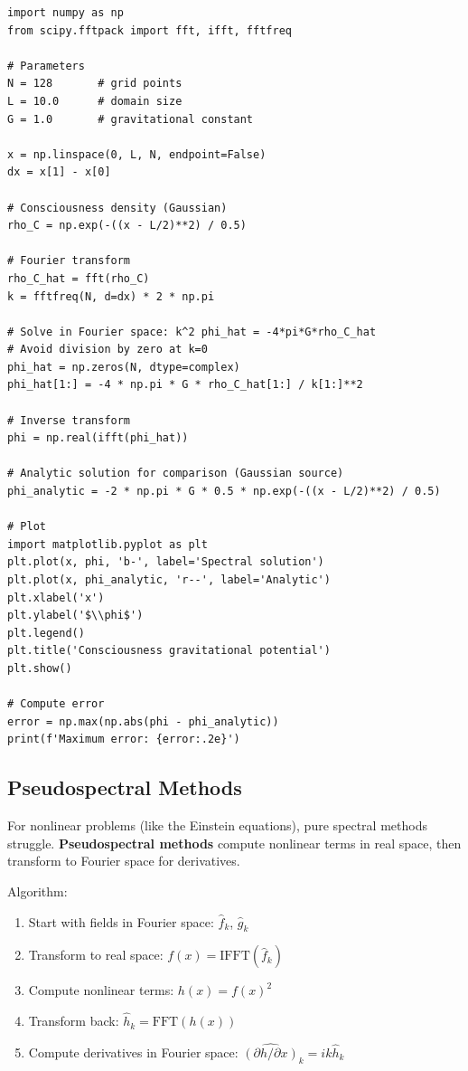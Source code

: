 \begin{lstlisting}[style=python, caption={Spectral method for Poisson equation}]
import numpy as np
from scipy.fftpack import fft, ifft, fftfreq

# Parameters
N = 128       # grid points
L = 10.0      # domain size
G = 1.0       # gravitational constant

x = np.linspace(0, L, N, endpoint=False)
dx = x[1] - x[0]

# Consciousness density (Gaussian)
rho_C = np.exp(-((x - L/2)**2) / 0.5)

# Fourier transform
rho_C_hat = fft(rho_C)
k = fftfreq(N, d=dx) * 2 * np.pi

# Solve in Fourier space: k^2 phi_hat = -4*pi*G*rho_C_hat
# Avoid division by zero at k=0
phi_hat = np.zeros(N, dtype=complex)
phi_hat[1:] = -4 * np.pi * G * rho_C_hat[1:] / k[1:]**2

# Inverse transform
phi = np.real(ifft(phi_hat))

# Analytic solution for comparison (Gaussian source)
phi_analytic = -2 * np.pi * G * 0.5 * np.exp(-((x - L/2)**2) / 0.5)

# Plot
import matplotlib.pyplot as plt
plt.plot(x, phi, 'b-', label='Spectral solution')
plt.plot(x, phi_analytic, 'r--', label='Analytic')
plt.xlabel('x')
plt.ylabel('$\\phi$')
plt.legend()
plt.title('Consciousness gravitational potential')
plt.show()

# Compute error
error = np.max(np.abs(phi - phi_analytic))
print(f'Maximum error: {error:.2e}')
\end{lstlisting}

\subsection{Pseudospectral Methods}

For nonlinear problems (like the Einstein equations), pure spectral methods struggle. \textbf{Pseudospectral methods} compute nonlinear terms in real space, then transform to Fourier space for derivatives.

Algorithm:
\begin{enumerate}
\item Start with fields in Fourier space: $\hat{f}_k$, $\hat{g}_k$
\item Transform to real space: $f(x) = \text{IFFT}(\hat{f}_k)$
\item Compute nonlinear terms: $h(x) = f(x)^2$
\item Transform back: $\hat{h}_k = \text{FFT}(h(x))$
\item Compute derivatives in Fourier space: $\widehat{(\partial h/\partial x)}_k = ik \hat{h}_k$
\end{enumerate}

